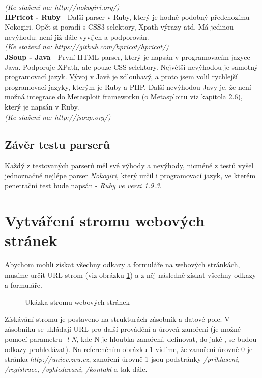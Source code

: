 \documentclass[12pt, a4paper]{report}
\begin{document}
\textit{(Ke stažení na: http://nokogiri.org/)}\\
\newline
\textbf{HPricot - Ruby} - Další parser v Ruby, který je hodně podobný předchozímu Nokogiri. Opět si poradí s CSS3 selektory, Xpath výrazy atd. Má jedinou nevýhodu: není již dále vyvíjen a podporován.\\
\textit{(Ke stažení na: https://github.com/hpricot/hpricot/)}\\
\newline
\textbf{JSoup - Java} - První HTML parser, který je napsán v programovacím jazyce Java. Podporuje XPath, ale pouze CSS selektory. Největší nevýhodou je samotný programovací jazyk. Vývoj v Javě je zdlouhavý, a proto jsem volil rychlejší programovací jazyky, kterým je Ruby a PHP. Další nevýhodou Javy je, že není možná integrace do Metasploit frameworku (o Metasploitu viz kapitola 2.6), který je napsán v Ruby.\\
\textit{(Ke stažení na: http://jsoup.org/)}

\subsection{Závěr testu parserů}
Každý z testovaných parserů měl své výhody a nevýhody, nicméně z testů vyšel jednoznačně nejlépe parser \textit{Nokogiri}, který určil i programovací jazyk, ve kterém penetrační test bude napsán - \textit{Ruby ve verzi 1.9.3}. 

\section{Vytváření stromu webových stránek}
Abychom mohli získat všechny odkazy a formuláře na webových stránkách, musíme určit URL strom (viz obrázku \ref{obr.url_stack}) a z něj následně získat všechny odkazy a formuláře.
\begin{figure}[h!]
\caption{Ukázka stromu webových stránek}
\label{obr.url_stack}
\end{figure}
Získávání stromu je postaveno na strukturách zásobník a datové pole. V zásobníku se ukládají URL pro další provádění a úroveň zanoření (je možné pomocí parametru \textit{-l N}, kde N je hloubka zanoření, definovat, do jaké , se budou odkazy prohledávat). Na referenčním obrázku \ref{obr.url_stack} vidíme, že zanoření úrovně 0 je stránka \textit{http://unicv.zcu.cz}, zanoření úrovně 1 jsou podstránky \textit{/prihlaseni, /registrace, /vyhledavani, /kontakt} a tak dále.
\end{document}
